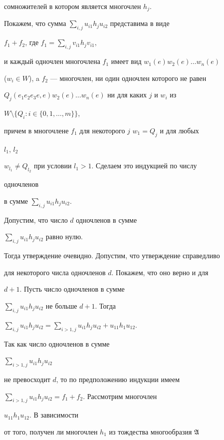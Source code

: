 сомножителей в котором является многочлен $h_j$.  


 


Покажем, что сумма $\sum\limits_{i,j}u_{i1}h_j u_{i2}$ представима в виде 


$f_1+f_2$, где $f_1=\sum\limits_{i,j}v_{i1}h_j v_{i1}$, 


и каждый одночлен многочлена $f_1$ имеет вид $w_1(e)w_2(e)\dotsc w_n(e)$ 


($w_i\in W$), a $f_2$ --- многочлен, ни один одночлен которого не равен  


$Q_j(e_1e_2e_3e,e)w_2(e)\dotsc w_n(e)$ ни для каких $j$ и $w_i$ из 


$W\setminus\{Q_i:i\in\{0,1,\dotsc,m\}\}$, 


причем в многочлене $f_1$ для некоторого $j$\; $w_1=Q_j$ и для любых 


$l_1$, $l_2$\; 


$w_{l_1}\ne Q_{l_2}$ при условии $l_1>1$. Сделаем это индукцией по числу 


одночленов  


в сумме $\sum\limits_{i,j}u_{i1}h_j u_{i2}$. 


 


Допустим, что число $d$ одночленов в сумме 


$\sum\limits_{i,j}u_{i1}h_j u_{i2}$ равно нулю. 


Тогда утверждение очевидно. Допустим, что утверждение справедливо  


для некоторого числа одночленов $d$. Покажем, что оно верно и для  


$d+1$. Пусть число одночленов в сумме 


$\sum\limits_{i,j}u_{i1}h_j u_{i2}$ не больше $d+1$. Тогда 


$\sum\limits_{i,j}u_{i1}h_j u_{i2}=\sum\limits_{i>1,j}u_{i1}h_j 


u_{i2}+u_{11}h_1u_{12}$. 


Так как число одночленов в сумме 


$\sum\limits_{i>1,j}u_{i1}h_j u_{i2}$ 


не превосходит $d$, то по предположению индукции имеем 


$\sum\limits_{i>1,j}u_{i1}h_j u_{i2}=f_1+f_2$. Рассмотрим многочлен 


$u_{11}h_1u_{12}$. В зависимости  


от того, получен ли многочлен $h_1$ из тождества многообразия $\frak A$  



